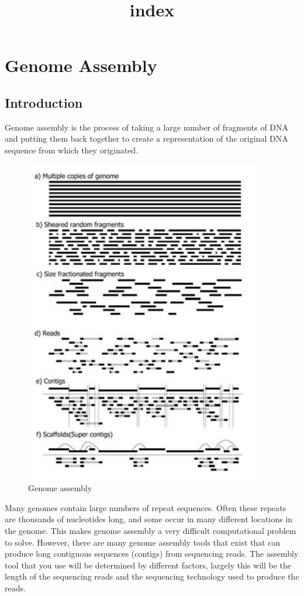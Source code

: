 \documentclass[11pt]{article}
\title{index}
\begin{document}
    \hypertarget{genome-assembly}{%
\section{Genome Assembly}\label{genome-assembly}}

\hypertarget{introduction}{%
\subsection{Introduction}\label{introduction}}

Genome assembly is the process of taking a large number of fragments of
DNA and putting them back together to create a representation of the
original DNA sequence from which they originated.

    \begin{figure}
\centering
\includegraphics{images/genome_assembly.png}
\caption{Genome assembly}
\end{figure}

    Many genomes contain large numbers of repeat sequences. Often these
repeats are thousands of nucleotides long, and some occur in many
different locations in the genome. This makes genome assembly a very
difficult computational problem to solve. However, there are many genome
assembly tools that exist that can produce long contiguous sequences
(contigs) from sequencing reads. The assembly tool that you use will be
determined by different factors, largely this will be the length of the
sequencing reads and the sequencing technology used to produce the
reads.
\end{document}
